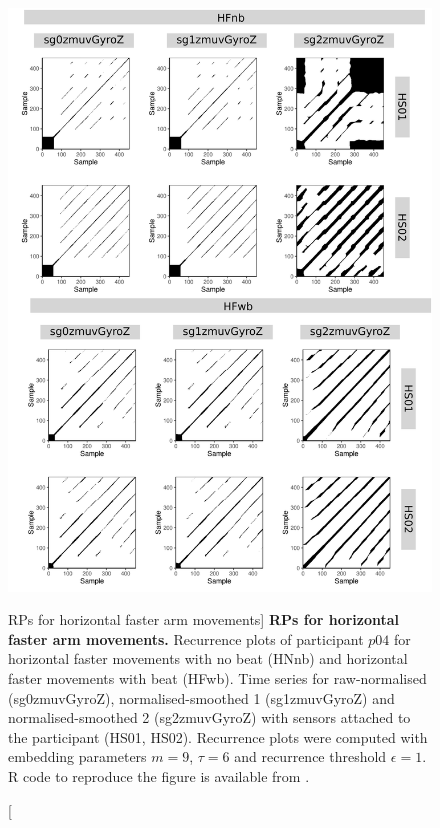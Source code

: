



\begin{figure}
\centering
\includegraphics[height=0.8\textheight]{rps_HF_w500_p04}
\caption
	[RPs for horizontal faster arm movements]{
	{\bf RPs for horizontal faster arm movements.}	
	Recurrence plots of participant $p04$ for 
	horizontal faster movements with no beat (HNnb) and
	horizontal faster movements with beat (HFwb).
	Time series for raw-normalised (sg0zmuvGyroZ), 
	normalised-smoothed 1 (sg1zmuvGyroZ) and 
	normalised-smoothed 2 (sg2zmuvGyroZ) with
	sensors attached to the participant (HS01, HS02).
	Recurrence plots were computed with 
	embedding parameters $m=9$, $\tau=6$ and 
	recurrence threshold $\epsilon=1$.
	R code to reproduce the figure is available from \cite{xochicale2018}.
        }
    \label{fig:rps_HF_w500_p04}
\end{figure}




